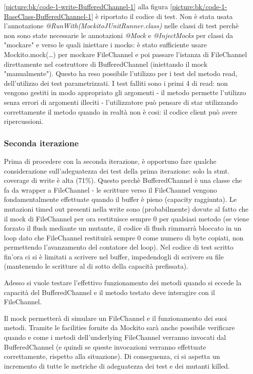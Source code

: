 \documentclass[10pt, a4paper]{article}
\newcommand{\getpicturelabel}[1]{picture:#1}
\begin{document}
	\ref{\getpicturelabel{bk/code-1-write-BufferedChannel-1}} alla figura
	\ref{\getpicturelabel{bk/code-1-BaseClass-BufferedChannel-1}} è riportato il codice di test.
	Non è stata usata l'annotazione \textit{@RunWith(MockitoJUnitRunner.class)} nelle classi di test perchè
	non sono state necessarie le annotazioni \textit{@Mock} e \textit{@InjectMocks} per classi da "mockare" e
	verso le quali iniettare i mocks: è stato sufficiente usare Mockito.mock(\dots) per mockare FileChannel e poi
	passare l'istanza di FileChannel direttamente nel costruttore di BufferedChannel 
	(iniettando il mock "manualmente"). 
	Questo ha reso possibile l'utilizzo per i test del metodo read, dell'utilizzo dei test parametrizzati.
	I test falliti sono i primi 4 di read: non vengono gestiti in modo appropriato gli argomenti - il metodo
	permette l'utilizzo senza errori di argomenti illeciti - l'utilizzatore può pensare di star utilizzando
	correttamente il metodo quando in realtà non è cosi: il codice client può avere ripercussioni.
	
	\subsubsection{Seconda iterazione}
	Prima di procedere con la seconda iterazione, è opportuno fare qualche considerazione sull'adeguatezza
	dei test della prima iterazione: solo la stmt. coverage di write è alta (71\%). Questo perchè BufferedChannel
	è una classe che fa da wrapper a FileChannel - le scritture verso il FileChannel vengono fondamentalmente
	effettuate quando il buffer è pieno (capacity raggiunta). Le mutazioni timed out presenti nella write
	sono (probabilmente) 
	dovute al fatto che il mock di FileChannel per ora restituisce sempre 0 per qualsiasi metodo (se viene
	forzato il flush mediante un mutante, il codice di flush rimmarrà bloccato in un loop dato che FileChannel
	restituirà sempre 0 come numero di byte copiati, non permettendo l'avanzamento del contatore del loop).
	Nel codice di test scritto fin'ora ci si è limitati a scrivere nel buffer, impedendogli di scrivere su file
	(mantenendo le scritture al di sotto della capacità prefissata).
	
	Adesso si vuole testare l'effettivo funzionamento dei metodi quando si eccede la capacità del BufferedChannel
	e il metodo testato deve interagire con il FileChannel.
	
	Il mock permetterà di simulare un FileChannel e il funzionamento
	dei suoi metodi. Tramite le facilities fornite da Mockito sarà anche possibile verificare quando e come i
	metodi dell'underlying FileChannel verranno invocati dal BufferedChannel (e quindi se queste invocazioni
	verranno effettuate correttamente, rispetto alla situazione).
	Di conseguenza, ci si aspetta un incremento di tutte le metriche di adeguatezza dei test e dei mutanti killed.
	
\end{document}
